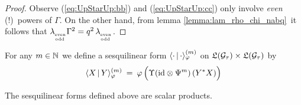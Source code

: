 \begin{proof}
  Observe (\ref{eq:UpStarUp:bb}) and (\ref{eq:UpStarUp:cc}) only
  involve {\em even\/} (!)\ powers of $\Gamma$.
  On the other hand, from lemma \ref{lemma:lam_rho_chi_nabq}\ it follows that
  $\lambda_{_{\stackrel{\scriptscriptstyle \rm even}{\scriptscriptstyle \! \rm odd}}} \Gamma^2 =  q^2\,\lambda_{_{\stackrel{\scriptscriptstyle \rm even}{\scriptscriptstyle \! \rm odd}}}$.
\end{proof}


\begin{defn*} \label{def:skalprodphi}
 For any $m\in \mathbb{N}$ we define a sesquilinear form $\langle \cdot \,|\,\cdot \rangle_\varphi^{(m)}$
 on $\mathfrak{L}(\mathcal G_\tau) \times \mathfrak{L}(\mathcal G_\tau)$ by
 $$ \skalphi{X}{Y}{m}  \: =\: \varphi \left(
      \Upsilon\!\left(\id \tens \Psi^m \right)(Y^* X)  \vertL\right)$$
\end{defn*}



\begin{lemma} \label{lemma:skalprodphi:positive}
  The sesquilinear forms defined above are scalar products.
\end{lemma}

